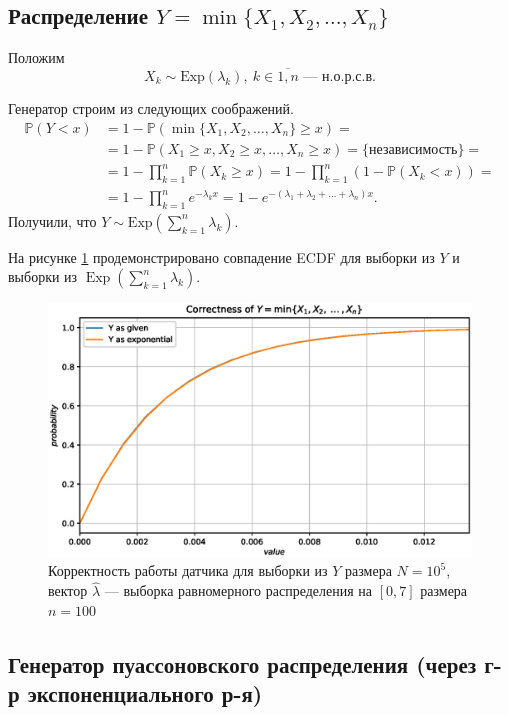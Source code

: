 \documentclass[11pt]{report}
\DeclareMathOperator{\Exp}{Exp}
\begin{document}
\subsection{\texorpdfstring{Распределение $Y=\min\{X_1,X_2,\dots,X_n\}$}{Распределение минимума экспоненциальных величин}}

Положим
$$
X_k \sim \mathrm{Exp}(\lambda_k),~ k\in\overline{1,n} \text{ --- н.о.р.с.в.}
$$

Генератор строим из следующих соображений.
$$
\begin{aligned}
\mathbb{P}(Y < x) &= 1 - \mathbb{P}(\min\{X_1,X_2,\dots,X_n\} \geqslant x) = \\
&= 1 - \mathbb{P}(X_1 \geqslant x, X_2 \geqslant x, \dots, X_n \geqslant x) = \{\text{независимость}\} = \\
&= 1 - \prod_{k=1}^{n}\mathbb{P}(X_k \geqslant x) = 1 - \prod_{k=1}^{n}(1 - \mathbb{P}(X_k < x)) = \\
&= 1 - \prod_{k=1}^{n}e^{-\lambda_kx} = 1 - e^{-(\lambda_1+\lambda_2+\dots+\lambda_n)x}.
\end{aligned}
$$
Получили, что $Y\sim\mathrm{Exp}(\sum_{k=1}^n\lambda_k)$.

На рисунке \ref{fig:min-expo.eps} продемонстрировано совпадение ECDF для выборки из $Y$ и выборки из $\Exp(\sum_{k=1}^n\lambda_k)$.

\begin{figure}[H]
    \centering
    \includegraphics[width=0.9\linewidth]{images/min-expo.eps}
    \caption{Корректность работы датчика для выборки из $Y$ размера $N=10^5$, вектор $\hat\lambda$ --- выборка равномерного распределения на $[0,7]$ размера $n=100$}
    \label{fig:min-expo.eps}
\end{figure}

\subsection{Генератор пуассоновского распределения (через г-р экспоненциального р-я)}
\end{document}
